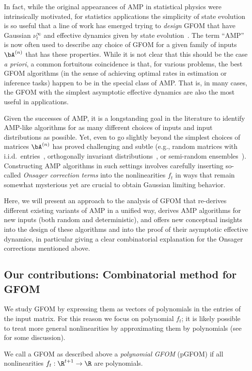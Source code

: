 In fact, while the original appearances of AMP in statistical physics were intrinsically motivated, for statistics applications the simplicity of state evolution is so useful that a line of work has emerged trying to \emph{design} GFOM that have Gaussian $\nu_t^{\infty}$ and effective dynamics given by state evolution~\cite{javanmard2013state,barbierSpatial,vila2015adaptive,fan2022approximate,zhong2024approximate, lovig2025universality}.
The term ``AMP'' is now often used to describe any choice of GFOM for a given family of inputs $\bA^{(n)}$ that has these properties.
While it is not clear that this should be the case \emph{a priori}, a common fortuitous coincidence is that, for various problems, the best GFOM algorithms (in the sense of achieving optimal rates in estimation or inference tasks) happen to be in the special class of AMP.
That is, in many cases, the GFOM with the simplest asymptotic effective dynamics are also the most useful in applications.


Given the successes of AMP, it is a longstanding goal in the literature to identify AMP-like algorithms for as many different choices of inputs and input distributions as possible.
Yet, even to go slightly beyond the simplest choices of matrices $\bA^{(n)}$ has proved challenging and subtle (e.g., random matrices with i.i.d.\ entries~\cite{javanmard2013state, bayati2015universality},
orthogonally invariant distributions~\cite{fan2022approximate}, or
semi-random ensembles~\cite{dudeja2023universality,wang2022universality}).
Constructing AMP algorithms in such settings involves carefully inserting so-called \emph{Onsager correction terms} into the nonlinearities $f_t$ in ways that remain somewhat mysterious yet are crucial to obtain Gaussian limiting behavior.

Here, we will present an approach to the analysis of GFOM that re-derives different existing variants of AMP in a unified way, derives AMP algorithms for new inputs (both random and deterministic), and offers new conceptual insights into the design of these algorithms and into the proof of their asymptotic effective dynamics, in particular giving a clear combinatorial explanation for the Onsager corrections mentioned above.

\subsection{Our contributions: Combinatorial method for GFOM}
\label{sec:results}

We study GFOM
by expressing them as vectors of polynomials in the entries of the input matrix.
For this reason we focus on polynomial $f_t$; it is likely possible to treat more general nonlinearities by approximating them by polynomials (see~ for some discussion).
\begin{definition}
    \label{def:pgfom}
    We call a GFOM as described above a \emph{polynomial GFOM} (pGFOM) if all nonlinearities $f_t: \R^{t + 1} \to \R$ are polynomials.
\end{definition}

